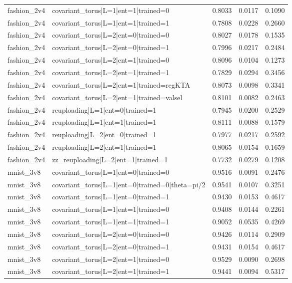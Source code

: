 \begin{table}
\begin{tabular}{llrrr}
fashion\_2v4 & covariant\_torus|L=1|ent=1|trained=0 & 0.8033 & 0.0117 & 0.1090 \\
fashion\_2v4 & covariant\_torus|L=1|ent=1|trained=1 & 0.7808 & 0.0228 & 0.2660 \\
fashion\_2v4 & covariant\_torus|L=2|ent=0|trained=0 & 0.8027 & 0.0178 & 0.1535 \\
fashion\_2v4 & covariant\_torus|L=2|ent=0|trained=1 & 0.7996 & 0.0217 & 0.2484 \\
fashion\_2v4 & covariant\_torus|L=2|ent=1|trained=0 & 0.8096 & 0.0104 & 0.1273 \\
fashion\_2v4 & covariant\_torus|L=2|ent=1|trained=1 & 0.7829 & 0.0294 & 0.3456 \\
fashion\_2v4 & covariant\_torus|L=2|ent=1|trained=regKTA & 0.8073 & 0.0098 & 0.3341 \\
fashion\_2v4 & covariant\_torus|L=2|ent=1|trained=valsel & 0.8101 & 0.0082 & 0.2463 \\
fashion\_2v4 & reuploading|L=1|ent=0|trained=1 & 0.7945 & 0.0200 & 0.2529 \\
fashion\_2v4 & reuploading|L=1|ent=1|trained=1 & 0.8111 & 0.0088 & 0.1579 \\
fashion\_2v4 & reuploading|L=2|ent=0|trained=1 & 0.7977 & 0.0217 & 0.2592 \\
fashion\_2v4 & reuploading|L=2|ent=1|trained=1 & 0.8065 & 0.0154 & 0.1659 \\
fashion\_2v4 & zz\_reuploading|L=2|ent=1|trained=1 & 0.7732 & 0.0279 & 0.1208 \\
mnist\_3v8 & covariant\_torus|L=1|ent=0|trained=0 & 0.9516 & 0.0091 & 0.2476 \\
mnist\_3v8 & covariant\_torus|L=1|ent=0|trained=0|theta=pi/2 & 0.9541 & 0.0107 & 0.3251 \\
mnist\_3v8 & covariant\_torus|L=1|ent=0|trained=1 & 0.9430 & 0.0153 & 0.4617 \\
mnist\_3v8 & covariant\_torus|L=1|ent=1|trained=0 & 0.9408 & 0.0144 & 0.2261 \\
mnist\_3v8 & covariant\_torus|L=1|ent=1|trained=1 & 0.9052 & 0.0535 & 0.4269 \\
mnist\_3v8 & covariant\_torus|L=2|ent=0|trained=0 & 0.9426 & 0.0114 & 0.2909 \\
mnist\_3v8 & covariant\_torus|L=2|ent=0|trained=1 & 0.9431 & 0.0154 & 0.4617 \\
mnist\_3v8 & covariant\_torus|L=2|ent=1|trained=0 & 0.9529 & 0.0090 & 0.2698 \\
mnist\_3v8 & covariant\_torus|L=2|ent=1|trained=1 & 0.9441 & 0.0094 & 0.5317 \\

\end{tabular}
\end{table}
